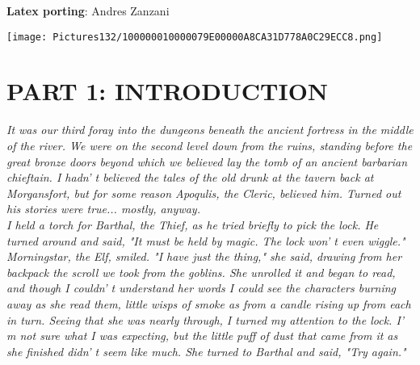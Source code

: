 \documentclass[a4paper,twoside,openany,10pt]{book}
\begin{document}
\textbf{Latex porting}: Andres Zanzani

\pagebreak

\thispagestyle{empty}

\onecolumn

\setcounter{page}{1}

\begin{multicols}{2}

\tableofcontents

\end{multicols}


\pagebreak

\thispagestyle{empty}

\texttt{[image: Pictures132/100000010000079E00000A8CA31D778A0C29ECC8.png]}

\pagebreak



\section{PART 1: INTRODUCTION}\label{part-1-introduction}

\textit{It was our third foray into the dungeons beneath the ancient fortress in the middle of the river. We were on the second level down from the ruins, standing before the great bronze doors beyond which we believed lay the tomb of an ancient barbarian chieftain. I hadn' t believed the tales of the old drunk at the tavern back at Morgansfort, but for some reason Apoqulis, the Cleric, believed him. Turned out his stories were true... mostly, anyway.}\\

\textit{I held a torch for Barthal, the Thief, as he tried briefly to pick the lock. He turned around and said, "It must be held by magic. The lock won' t even wiggle."}\\

\textit{Morningstar, the Elf, smiled. "I have just the thing," she said, drawing from her backpack the scroll we took from the goblins. She unrolled it and began to read, and though I couldn' t understand her words I could see the characters burning away as she read them, little wisps of smoke as from a candle rising up from each in turn. Seeing that she was nearly through, I turned my attention to the lock. I' m not sure what I was expecting, but the little puff of dust that came from it as she finished didn' t seem like much. She turned to Barthal and said, "Try again."}\\
\end{document}
